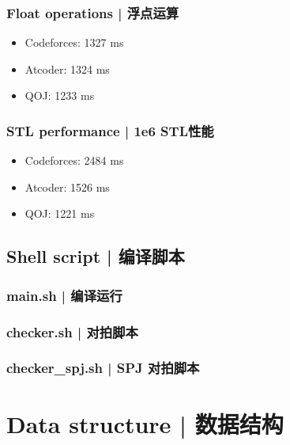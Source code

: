 \documentclass[8pt,a4paper]{article}
\newcommand{\code}[1]{
    
}
\newcommand{\shcode}[1]{
    
}
\newcommand{\txt}[1]{\par\noindent\footnotesize #1}
\begin{document}
\begin{multicols}{2}
        \subsubsection{Float operations | 浮点运算}
            \txt{\begin{itemize}
                \item Codeforces: 1327 ms
                \item Atcoder: 1324 ms
                \item QOJ: 1233 ms
            \end{itemize}}
            \code{src/misc/test_float.cpp}

        \subsubsection{STL performance | 1e6 STL性能}
            \txt{\begin{itemize}
                \item Codeforces: 2484 ms
                \item Atcoder: 1526 ms
                \item QOJ: 1221 ms
            \end{itemize}}
            \code{src/misc/test_stl.cpp}

    \subsection{Shell script | 编译脚本}

        \subsubsection{main.sh | 编译运行}
            \shcode{src/misc/main.sh}

        \subsubsection{checker.sh | 对拍脚本}
            \shcode{src/misc/checker.sh}

        \subsubsection{checker\_spj.sh | SPJ 对拍脚本}
            \shcode{src/misc/checker\_spj.sh}

\section{Data structure | 数据结构}


\end{multicols}
\end{document}

